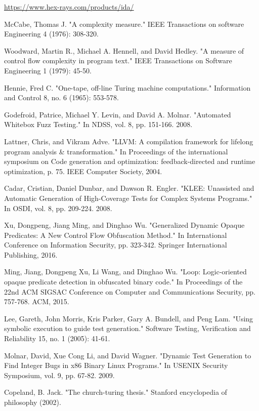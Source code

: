 \documentclass[ms,12pt]{psuthesis}
\begin{document}
\begin{singlespace}
\begin{thebibliography}{99}
 \url{https://www.hex-rays.com/products/ida/}

 McCabe, Thomas J. "A complexity measure." IEEE Transactions on software Engineering 4 (1976): 308-320.

 Woodward, Martin R., Michael A. Hennell, and David Hedley. "A measure of control flow complexity in program text." IEEE Transactions on Software Engineering 1 (1979): 45-50.

 Hennie, Fred C. "One-tape, off-line Turing machine computations." Information and Control 8, no. 6 (1965): 553-578.

 Godefroid, Patrice, Michael Y. Levin, and David A. Molnar. "Automated Whitebox Fuzz Testing." In NDSS, vol. 8, pp. 151-166. 2008.

 Lattner, Chris, and Vikram Adve. "LLVM: A compilation framework for lifelong program analysis \& transformation." In Proceedings of the international symposium on Code generation and optimization: feedback-directed and runtime optimization, p. 75. IEEE Computer Society, 2004.

 Cadar, Cristian, Daniel Dunbar, and Dawson R. Engler. "KLEE: Unassisted and Automatic Generation of High-Coverage Tests for Complex Systems Programs." In OSDI, vol. 8, pp. 209-224. 2008.

 Xu, Dongpeng, Jiang Ming, and Dinghao Wu. "Generalized Dynamic Opaque Predicates: A New Control Flow Obfuscation Method." In International Conference on Information Security, pp. 323-342. Springer International Publishing, 2016.

 Ming, Jiang, Dongpeng Xu, Li Wang, and Dinghao Wu. "Loop: Logic-oriented opaque predicate detection in obfuscated binary code." In Proceedings of the 22nd ACM SIGSAC Conference on Computer and Communications Security, pp. 757-768. ACM, 2015.

 Lee, Gareth, John Morris, Kris Parker, Gary A. Bundell, and Peng Lam. "Using symbolic execution to guide test generation." Software Testing, Verification and Reliability 15, no. 1 (2005): 41-61.

 Molnar, David, Xue Cong Li, and David Wagner. "Dynamic Test Generation to Find Integer Bugs in x86 Binary Linux Programs." In USENIX Security Symposium, vol. 9, pp. 67-82. 2009.

 Copeland, B. Jack. "The church-turing thesis." Stanford encyclopedia of philosophy (2002).


\end{thebibliography}
\end{singlespace}
\end{document}
